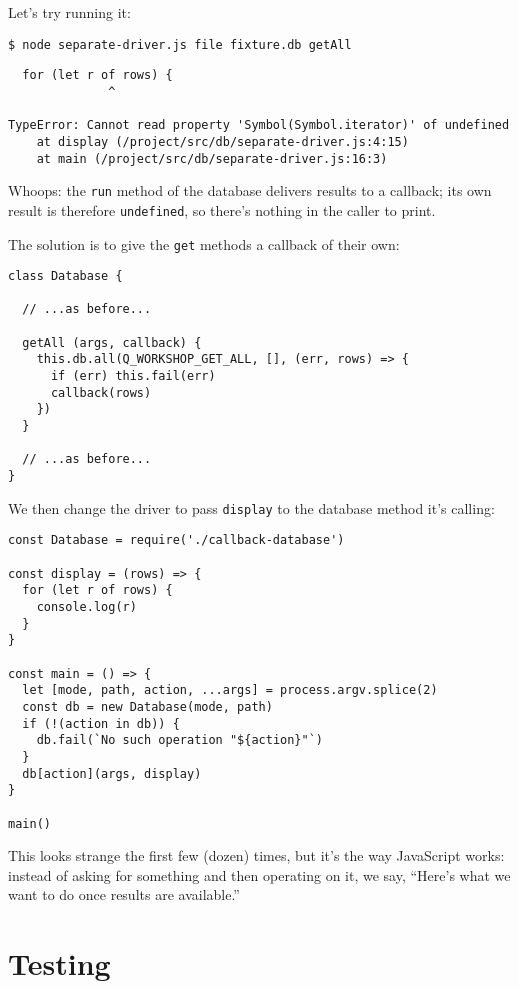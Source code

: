 Let's try running it:

\begin{verbatim}
$ node separate-driver.js file fixture.db getAll
\end{verbatim}

\begin{verbatim}
  for (let r of rows) {
              ^

TypeError: Cannot read property 'Symbol(Symbol.iterator)' of undefined
    at display (/project/src/db/separate-driver.js:4:15)
    at main (/project/src/db/separate-driver.js:16:3)
\end{verbatim}

Whoops: the \texttt{run} method of the database delivers results to a callback;
its own result is therefore \texttt{undefined},
so there's nothing in the caller to print.

The solution is to give the \texttt{get} methods a callback of their own:

\begin{verbatim}
class Database {

  // ...as before...

  getAll (args, callback) {
    this.db.all(Q_WORKSHOP_GET_ALL, [], (err, rows) => {
      if (err) this.fail(err)
      callback(rows)
    })
  }

  // ...as before...
}
\end{verbatim}

We then change the driver to pass \texttt{display} to the database method it's calling:

\begin{verbatim}
const Database = require('./callback-database')

const display = (rows) => {
  for (let r of rows) {
    console.log(r)
  }
}

const main = () => {
  let [mode, path, action, ...args] = process.argv.splice(2)
  const db = new Database(mode, path)
  if (!(action in db)) {
    db.fail(`No such operation "${action}"`)
  }
  db[action](args, display)
}

main()
\end{verbatim}

This looks strange the first few (dozen) times,
but it's the way JavaScript works:
instead of asking for something and then operating on it,
we say,
``Here's what we want to do once results are available.''

\section{Testing}\label{s:db-testing}

